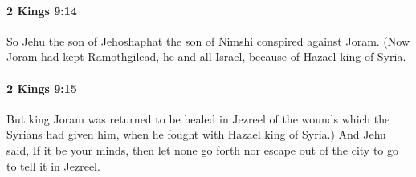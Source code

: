 		\paragraph{2 Kings 9:14} %
			\label{2KINGS-9-14}

			So Jehu the son of Jehoshaphat the son of Nimshi conspired against Joram. (Now Joram had kept Ramothgilead, he and all Israel, because of Hazael king of Syria.


		\paragraph{2 Kings 9:15} %
			\label{2KINGS-9-15}

			But king Joram was returned to be healed in Jezreel of the wounds which the Syrians had given him, when he fought with Hazael king of Syria.) And Jehu said, If it be your minds, then let none go forth nor escape out of the city to go to tell it in Jezreel.

